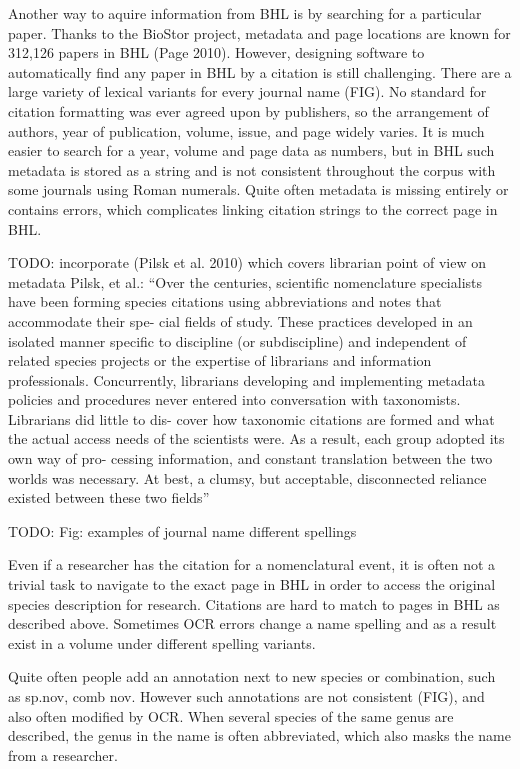 \documentclass[
]{article}
\begin{document}
Another way to aquire information from BHL is by searching for a
particular paper. Thanks to the BioStor project, metadata and page
locations are known for 312,126 papers in BHL (Page 2010). However,
designing software to automatically find any paper in BHL by a citation
is still challenging. There are a large variety of lexical variants for
every journal name (FIG). No standard for citation formatting was ever
agreed upon by publishers, so the arrangement of authors, year of
publication, volume, issue, and page widely varies. It is much easier to
search for a year, volume and page data as numbers, but in BHL such
metadata is stored as a string and is not consistent throughout the
corpus with some journals using Roman numerals. Quite often metadata is
missing entirely or contains errors, which complicates linking citation
strings to the correct page in BHL.

TODO: incorporate (Pilsk et al. 2010) which covers librarian point of
view on metadata Pilsk, et al.: ``Over the centuries, scientific
nomenclature specialists have been forming species citations using
abbreviations and notes that accommodate their spe- cial fields of
study. These practices developed in an isolated manner specific to
discipline (or subdiscipline) and independent of related species
projects or the expertise of librarians and information professionals.
Concurrently, librarians developing and implementing metadata policies
and procedures never entered into conversation with taxonomists.
Librarians did little to dis- cover how taxonomic citations are formed
and what the actual access needs of the scientists were. As a result,
each group adopted its own way of pro- cessing information, and constant
translation between the two worlds was necessary. At best, a clumsy, but
acceptable, disconnected reliance existed between these two fields''

TODO: Fig: examples of journal name different spellings

Even if a researcher has the citation for a nomenclatural event, it is
often not a trivial task to navigate to the exact page in BHL in order
to access the original species description for research. Citations are
hard to match to pages in BHL as described above. Sometimes OCR errors
change a name spelling and as a result exist in a volume under different
spelling variants.

Quite often people add an annotation next to new species or combination,
such as sp.nov, comb nov. However such annotations are not consistent
(FIG), and also often modified by OCR. When several species of the same
genus are described, the genus in the name is often abbreviated, which
also masks the name from a researcher.
\end{document}
